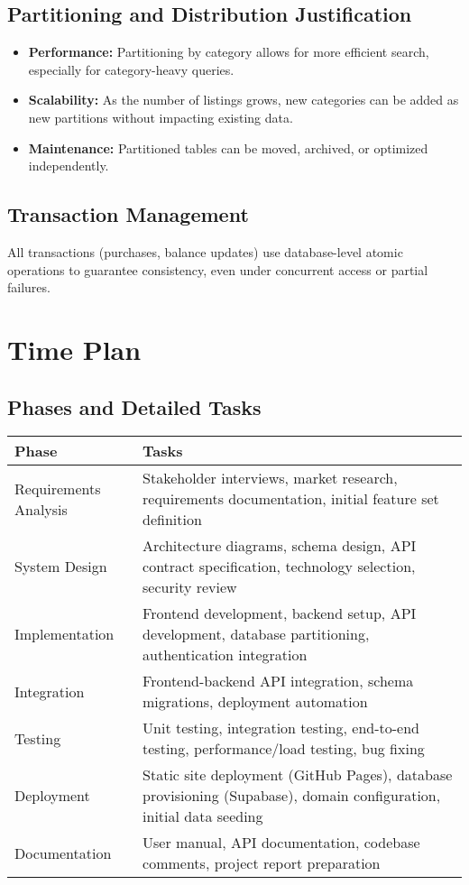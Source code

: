 \documentclass[12pt,a4paper]{report}
\begin{document}
\section{Partitioning and Distribution Justification}
\begin{itemize}
    \item \textbf{Performance:} Partitioning by category allows for more efficient search, especially for category-heavy queries.
    \item \textbf{Scalability:} As the number of listings grows, new categories can be added as new partitions without impacting existing data.
    \item \textbf{Maintenance:} Partitioned tables can be moved, archived, or optimized independently.
\end{itemize}

\section{Transaction Management}
All transactions (purchases, balance updates) use database-level atomic operations to guarantee consistency, even under concurrent access or partial failures.

\chapter{Time Plan}
\section{Phases and Detailed Tasks}
\begin{longtable}{|p{}|p{}|}
    \hline
    \textbf{Phase} & \textbf{Tasks} \\
    \hline
    Requirements Analysis & Stakeholder interviews, market research, requirements documentation, initial feature set definition \\
    \hline
    System Design & Architecture diagrams, schema design, API contract specification, technology selection, security review \\
    \hline
    Implementation & Frontend development, backend setup, API development, database partitioning, authentication integration \\
    \hline
    Integration & Frontend-backend API integration, schema migrations, deployment automation \\
    \hline
    Testing & Unit testing, integration testing, end-to-end testing, performance/load testing, bug fixing \\
    \hline
    Deployment & Static site deployment (GitHub Pages), database provisioning (Supabase), domain configuration, initial data seeding \\
    \hline
    Documentation & User manual, API documentation, codebase comments, project report preparation \\
    \hline
\end{longtable}
\end{document}
